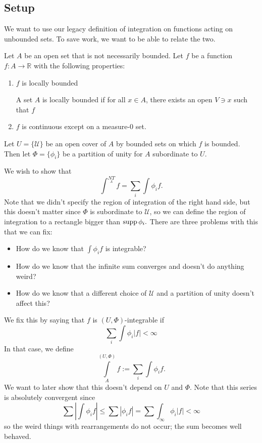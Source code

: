 \documentclass{article}
\numberwithin{equation}{section}
\begin{document}
\subsection{Setup}
We want to use our legacy definition of integration on functions acting on unbounded sets. To save work, we want to be able to relate the two.

Let $A$ be an open set that is not necessarily bounded. Let $f$ be a function $f:A\rightarrow \mathbb{R}$ with the following properties:
\begin{enumerate}
    \item $f$ is locally bounded
    \begin{definition}
        A set $A$ is locally bounded if for all $x\in A$, there exists an open $V \ni x$ such that $f$
    \end{definition}
    \item $f$ is continuous except on a measure-$0$ set.
\end{enumerate}
Let $U=\{\mathcal{U}\}$ be an open cover of $A$ by bounded sets on which $f$ is bounded. Then let $\Phi = \{\phi_i\}$ be a partition of unity for $A$ subordinate to $U$.

We wish to show that 
\begin{equation}
    \int^{NT}\limits_{A} f = \sum_i \int \phi_i f.
\end{equation}
Note that we didn't specify the region of integration of the right hand side, but this doesn't matter since $\Phi$ is subordinate to $\mathcal{U}$, so we can define the region of integration to a rectangle bigger than $\operatorname{supp} \phi_i.$ There are three problems with this that we can fix:
\begin{itemize}
    \item How do we know that $\int \phi_i f$ is integrable?
    \item How do we know that the infinite sum converges and doesn't do anything weird?
    \item How do we know that a different choice of $\mathcal{U}$ and a partition of unity doesn't affect this?
\end{itemize}
We fix this by saying that $f$ is $(U,\Phi)$-integrable if 
\begin{equation}
    \sum_i \int\phi_i |f| < \infty
\end{equation}
In that case, we define 
\begin{equation}
    \int\limits_A^{(U,\Phi)} f := \sum_{i} \int \phi_i f.
\end{equation}
We want to later show that this doesn't depend on $U$ and $\Phi.$ Note that this series is absolutely convergent since
\begin{equation}
    \sum \left|\int \phi_i f\right| \le \sum |\phi_i f| = \sum\int_{\infty}\phi_i |f| < \infty
\end{equation}
so the weird things with rearrangements do not occur; the sum becomes well behaved.
\end{document}
